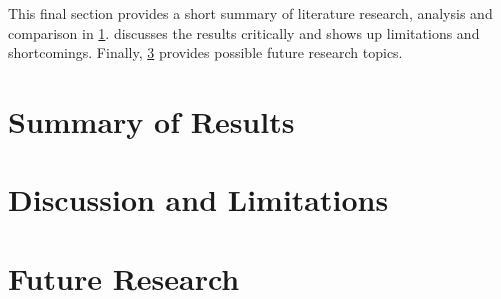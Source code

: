 This final section provides a short summary of literature research, analysis and comparison in \cref{s:conclusions-summary}.
 discusses the results critically and shows up limitations and shortcomings. 
Finally, \cref{s:conclusions-future} provides possible future research topics.

\section{Summary of Results}
\label{s:conclusions-summary}


\section{Discussion and Limitations}
\label{s:conclusions-discussion}

\section{Future Research}
\label{s:conclusions-future}

